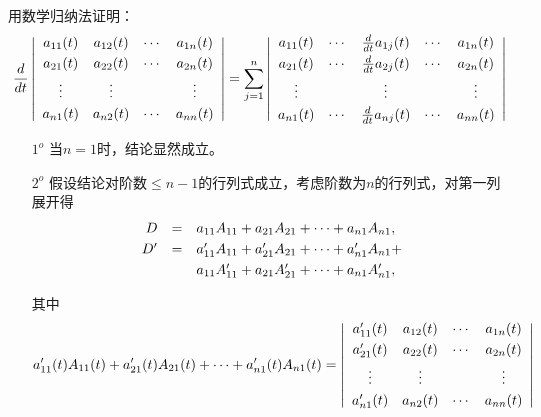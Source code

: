 \begin{frame}
  \begin{footnotesize}
    \begin{exampleblock}{45}
      用数学归纳法证明：
      $$
      \frac{d}{dt} \left|
      \begin{array}{cccc}
        a_{11}(t)&a_{12}(t)&\cdots&a_{1n}(t)\\[0.1cm]
        a_{21}(t)&a_{22}(t)&\cdots&a_{2n}(t)\\[0.1cm]
        \vdots&\vdots&&\vdots\\[0.1cm]
        a_{n1}(t)&a_{n2}(t)&\cdots&a_{nn}(t)
      \end{array}
      \right| = \sum_{j=1}^n\left|
      \begin{array}{ccccc}
        a_{11}(t)&\cdots&\frac{d}{dt} a_{1j}(t)&\cdots&a_{1n}(t)\\[0.1cm]
        a_{21}(t)&\cdots&\frac{d}{dt} a_{2j}(t)&\cdots&a_{2n}(t)\\[0.1cm]
        \vdots&&\vdots&&\vdots\\[0.1cm]
        a_{n1}(t)&\cdots&\frac{d}{dt} a_{nj}(t)&\cdots&a_{nn}(t)
      \end{array}
      \right|
      $$
    \end{exampleblock}
  \end{footnotesize}
\end{frame}

\begin{frame}
  \begin{footnotesize}
    \begin{itemize}
    \item[$1^o$] 当$n=1$时，结论显然成立。
    \item[$2^o$] 假设结论对阶数$\le n-1$的行列式成立，考虑阶数为$n$的行列式，对第一列展开得
      $$
      \begin{array}{rcl}
        D &=& a_{11}A_{11} +  a_{21}A_{21} + \cdots + a_{n1}A_{n1}, \\[0.1cm]
        D^\prime &=& a_{11}^\prime A_{11} +  a_{21}^\prime A_{21} + \cdots + a_{n1}^\prime A_{n1} + \\[0.1cm]
        && a_{11}A_{11}^\prime +  a_{21}A_{21}^\prime + \cdots + a_{n1}A_{n1}^\prime,      
      \end{array}
      $$
      
      其中
      $$
      a_{11}^\prime(t) A_{11}(t) +  a_{21}^\prime(t) A_{21}(t)
      + \cdots + a_{n1}^\prime(t) A_{n1}(t)
      = 
      \left|
      \begin{array}{cccc}
        a_{11}^\prime(t)&a_{12}(t)&\cdots&a_{1n}(t)\\[0.1cm]
        a_{21}^\prime(t)&a_{22}(t)&\cdots&a_{2n}(t)\\[0.1cm]
        \vdots&\vdots&&\vdots\\[0.1cm]
        a_{n1}^\prime(t)&a_{n2}(t)&\cdots&a_{nn}(t)
      \end{array}
      \right| 
      $$
    \end{itemize}
  \end{footnotesize}
\end{frame}

